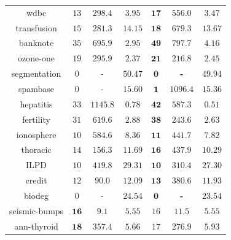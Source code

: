 \begin{tabular}{ccccccc}
wdbc & $13$ & $298.4$ & $3.95$ & $\mathbf{17}$ & $\mathbf{556.0}$ & $\mathbf{3.47}$\\
transfusion & $15$ & $281.3$ & $14.15$ & $\mathbf{18}$ & $\mathbf{679.3}$ & $\mathbf{13.67}$\\
banknote & $35$ & $695.9$ & $2.95$ & $\mathbf{49}$ & $\mathbf{797.7}$ & $\mathbf{4.16}$\\
ozone-one & $19$ & $295.9$ & $2.37$ & $\mathbf{21}$ & $\mathbf{216.8}$ & $\mathbf{2.45}$\\
segmentation & $0$ & - & $50.47$ & $\mathbf{0}$ & \textbf{-} & $\mathbf{49.94}$\\
spambase & $0$ & - & $15.60$ & $\mathbf{1}$ & $\mathbf{1096.4}$ & $\mathbf{15.36}$\\
\hline
hepatitis & $33$ & $1145.8$ & $0.78$ & $\mathbf{42}$ & $\mathbf{587.3}$ & $\mathbf{0.51}$\\
fertility & $31$ & $619.6$ & $2.88$ & $\mathbf{38}$ & $\mathbf{243.6}$ & $\mathbf{2.63}$\\
ionosphere & $10$ & $584.6$ & $8.36$ & $\mathbf{11}$ & $\mathbf{441.7}$ & $\mathbf{7.82}$\\
thoracic & $14$ & $156.3$ & $11.69$ & $\mathbf{16}$ & $\mathbf{437.9}$ & $\mathbf{10.29}$\\
ILPD & $10$ & $419.8$ & $29.31$ & $\mathbf{10}$ & $\mathbf{310.4}$ & $\mathbf{27.30}$\\
credit & $12$ & $90.0$ & $12.09$ & $\mathbf{13}$ & $\mathbf{380.6}$ & $\mathbf{11.93}$\\
biodeg & $0$ & - & $24.54$ & $\mathbf{0}$ & \textbf{-} & $\mathbf{23.54}$\\
seismic-bumps & $\mathbf{16}$ & $\mathbf{9.1}$ & $\mathbf{5.55}$ & $16$ & $11.5$ & $5.55$\\
ann-thyroid & $\mathbf{18}$ & $\mathbf{357.4}$ & $\mathbf{5.66}$ & $17$ & $276.9$ & $5.93$\\
\hline
\end{tabular}